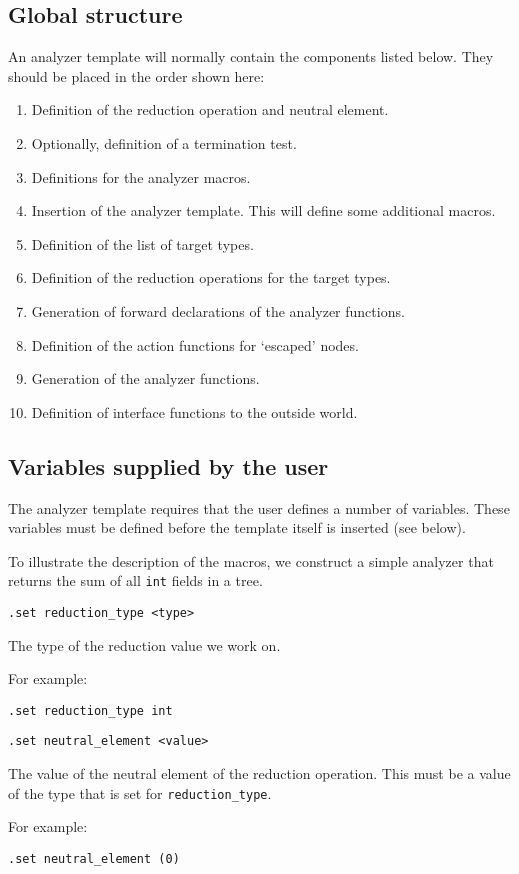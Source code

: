 \subsection{Global structure}
An analyzer template will normally contain the components listed below.
They should be placed in the order shown here:
\begin{enumerate}
\item Definition of the reduction operation and neutral element.
\item Optionally, definition of a termination test.
\item Definitions for the analyzer macros.
\item Insertion of the analyzer template. This will define some
 additional macros.
\item Definition of the list of target types.
\item Definition of the reduction operations for the target types.
\item Generation of forward declarations of the analyzer functions.
\item Definition of the action functions for `escaped' nodes.
\item Generation of the analyzer functions.
\item Definition of interface functions to the outside world.
\end{enumerate}
\subsection{Variables supplied by the user}
The analyzer template requires that the user defines a number of
variables.
These variables must be defined before the template itself is inserted
(see below).
\par
To illustrate the description of the macros, we construct a simple
analyzer that returns the sum of all {\tt int} fields in a tree.

\begin{verbatim}
.set reduction_type <type>
\end{verbatim}
\begin{desc}
The type of the reduction value we work on.
\par
For example:
\begin{verbatim}
.set reduction_type int
\end{verbatim}
\end{desc}

\begin{verbatim}
.set neutral_element <value>
\end{verbatim}
\begin{desc}
The value of the neutral element of the reduction operation.
This must be a value of the type that is set for \verb'reduction_type'.
\par
For example:
\begin{verbatim}
.set neutral_element (0)
\end{verbatim}
\end{desc}

